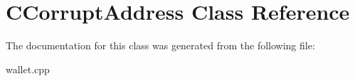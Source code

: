 \hypertarget{class_c_corrupt_address}{}\section{C\+Corrupt\+Address Class Reference}
\label{class_c_corrupt_address}


The documentation for this class was generated from the following file\+:\begin{DoxyCompactItemize}
\item 
wallet.\+cpp\end{DoxyCompactItemize}
